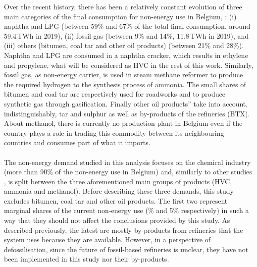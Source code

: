 Over the recent history, there has been a relatively constant evolution of three main categories of the final consumption for non-energy use in Belgium, \cite{statbel_NED_2019}: (i) naphtha and \gls{LPG} (between 59\% and 67\% of the total final consumption, around 59.4\,TWh in 2019), (ii) fossil gas (between 9\% and 14\%, 11.8\,TWh in 2019), and (iii) others (\ie bitumen, coal tar and other oil products) (between 21\% and 28\%). Naphtha and \gls{LPG} are consumed in a naphtha cracker, which results in ethylene and propylene, what will be considered as \gls{HVC} in the rest of this work. Similarly, fossil gas, as non-energy carrier, is used in steam methane reformer to produce the required hydrogen to the synthesis process of ammonia. The small shares of bitumen and coal tar are respectively used for roadworks and to produce synthetic gas through gasification. Finally \og other oil products'' take into account, indistinguishably, tar and sulphur as well as by-products of the refineries (\eg \gls{BTX}). About methanol, there is currently no production plant in Belgium even if the country plays a role in trading this commodity between its neighbouring countries and consumes part of what it imports.\\

\\

\noindent
The non-energy demand studied in this analysis focuses on the chemical industry (more than 90\% of the non-energy use in Belgium) and, similarly to other studies \cite{IEA2018_petrochemicals, daioglou2014energy}, is split between the three aforementioned main groups of products (\ie \gls{HVC}, ammonia and methanol). Before describing these three demands, this study excludes bitumen, coal tar and \og other oil products\fg. The first two represent marginal shares of the current non-energy use (\% and 5\% respectively) in such a way that they should not affect the conclusions provided by this study. As described previously, the latest are mostly by-products from refineries that the system uses because they are available. However, in a perspective of defossilisation, since the future of fossil-based refineries is unclear, they have not been implemented in this study nor their by-products.\\

